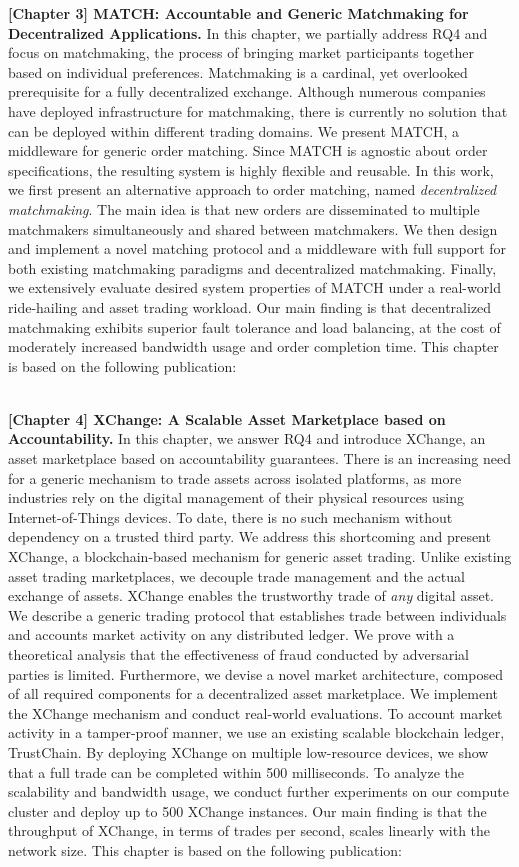 \textbf{[Chapter 3] MATCH: Accountable and Generic Matchmaking for Decentralized Applications.}
In this chapter, we partially address RQ4 and focus on matchmaking, the process of bringing market participants together based on individual preferences.
Matchmaking is a cardinal, yet overlooked prerequisite for a fully decentralized exchange.
Although numerous companies have deployed infrastructure for matchmaking, there is currently no solution that can be deployed within different trading domains.
We present MATCH, a middleware for generic order matching.
Since MATCH is agnostic about order specifications, the resulting system is highly flexible and reusable.
In this work, we first present an alternative approach to order matching, named \emph{decentralized matchmaking}.
The main idea is that new orders are disseminated to multiple matchmakers simultaneously and shared between matchmakers.
We then design and implement a novel matching protocol and a middleware with full support for both existing matchmaking paradigms and decentralized matchmaking.
Finally, we extensively evaluate desired system properties of MATCH under a real-world ride-hailing and asset trading workload.
Our main finding is that decentralized matchmaking exhibits superior fault tolerance and load balancing, at the cost of moderately increased bandwidth usage and order completion time.
This chapter is based on the following publication:

\\

\textbf{[Chapter 4] XChange: A Scalable Asset Marketplace based on Accountability.}
In this chapter, we answer RQ4 and introduce XChange, an asset marketplace based on accountability guarantees.
There is an increasing need for a generic mechanism to trade assets across isolated platforms, as more industries rely on the digital management of their physical resources using Internet-of-Things devices.
To date, there is no such mechanism without dependency on a trusted third party.
We address this shortcoming and present XChange, a blockchain-based mechanism for generic asset trading.
Unlike existing asset trading marketplaces, we decouple trade management and the actual exchange of assets.
XChange enables the trustworthy trade of \emph{any} digital asset.
We describe a generic trading protocol that establishes trade between individuals and accounts market activity on any distributed ledger.
We prove with a theoretical analysis that the effectiveness of fraud conducted by adversarial parties is limited.
Furthermore, we devise a novel market architecture, composed of all required components for a decentralized asset marketplace.
We implement the XChange mechanism and conduct real-world evaluations.
To account market activity in a tamper-proof manner, we use an existing scalable blockchain ledger, TrustChain.
By deploying XChange on multiple low-resource devices, we show that a full trade can be completed within 500 milliseconds.
To analyze the scalability and bandwidth usage, we conduct further experiments on our compute cluster and deploy up to 500 XChange instances.
Our main finding is that the throughput of XChange, in terms of trades per second, scales linearly with the network size.
This chapter is based on the following publication:

